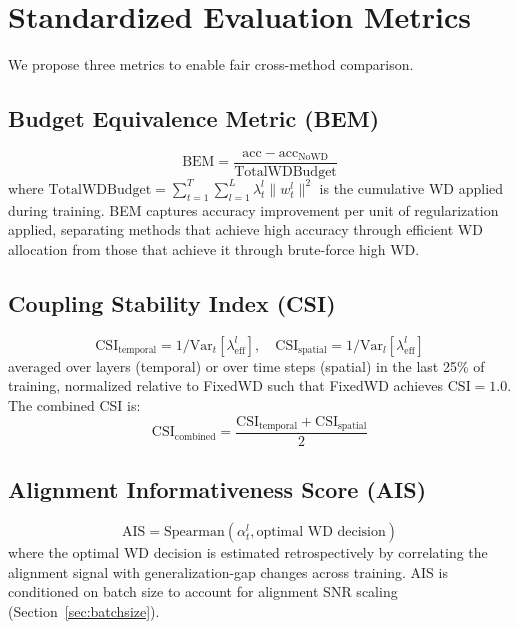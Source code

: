 \documentclass{article}
\begin{document}
\section{Standardized Evaluation Metrics}
\label{sec:metrics}

We propose three metrics to enable fair cross-method comparison.

\subsection{Budget Equivalence Metric (BEM)}

\begin{equation}
  \text{BEM} = \frac{\text{acc} - \text{acc}_{\text{NoWD}}}{\text{TotalWDBudget}}
\end{equation}
where $\text{TotalWDBudget} = \sum_{t=1}^{T} \sum_{l=1}^{L} \lambda_t^l \|w_t^l\|^2$ is the cumulative WD applied during training. BEM captures accuracy improvement per unit of regularization applied, separating methods that achieve high accuracy through efficient WD allocation from those that achieve it through brute-force high WD.

\subsection{Coupling Stability Index (CSI)}

\begin{equation}
  \text{CSI}_{\text{temporal}} = 1 / \text{Var}_t[\lambda_{\text{eff}}^l], \quad \text{CSI}_{\text{spatial}} = 1 / \text{Var}_l[\lambda_{\text{eff}}^l]
\end{equation}
averaged over layers (temporal) or over time steps (spatial) in the last 25\% of training, normalized relative to FixedWD such that FixedWD achieves $\text{CSI} = 1.0$. The combined CSI is:
\begin{equation}
  \text{CSI}_{\text{combined}} = \frac{\text{CSI}_{\text{temporal}} + \text{CSI}_{\text{spatial}}}{2}
\end{equation}

\subsection{Alignment Informativeness Score (AIS)}

\begin{equation}
  \text{AIS} = \text{Spearman}(\alpha_t^l, \text{optimal WD decision})
\end{equation}
where the optimal WD decision is estimated retrospectively by correlating the alignment signal with generalization-gap changes across training. AIS is conditioned on batch size to account for alignment SNR scaling (Section~\ref{sec:batchsize}).
\end{document}

